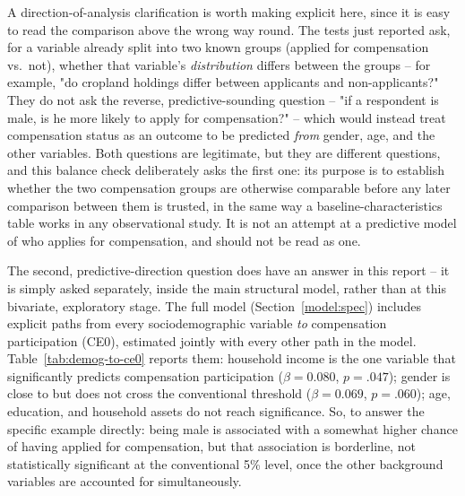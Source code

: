 A direction-of-analysis clarification is worth making explicit here, since
it is easy to read the comparison above the wrong way round. The tests just
reported ask, for a variable already split into two known groups (applied
for compensation vs.\ not), whether that variable's \emph{distribution}
differs between the groups -- for example, "do cropland holdings differ
between applicants and non-applicants?" They do not ask the reverse,
predictive-sounding question -- "if a respondent is male, is he more likely
to apply for compensation?" -- which would instead treat compensation status
as an outcome to be predicted \emph{from} gender, age, and the other
variables. Both questions are legitimate, but they are different questions,
and this balance check deliberately asks the first one: its purpose is to
establish whether the two compensation groups are otherwise comparable
before any later comparison between them is trusted, in the same way a
baseline-characteristics table works in any observational study. It is not
an attempt at a predictive model of who applies for compensation, and should
not be read as one.

The second, predictive-direction question does have an answer in this
report -- it is simply asked separately, inside the main structural model,
rather than at this bivariate, exploratory stage. The full model
(Section~\ref{model:spec}) includes explicit paths from every
sociodemographic variable \emph{to} compensation participation (CE0), estimated
jointly with every other path in the model. Table~\ref{tab:demog-to-ce0}
reports them: household income is the one variable that significantly
predicts compensation participation ($\beta = 0.080$, $p = .047$); gender is
close to but does not cross the conventional threshold ($\beta = 0.069$,
$p = .060$); age, education, and household assets do not reach significance.
So, to answer the specific example directly: being male is associated with a
somewhat higher chance of having applied for compensation, but that
association is borderline, not statistically significant at the conventional
5\% level, once the other background variables are accounted for
simultaneously.

